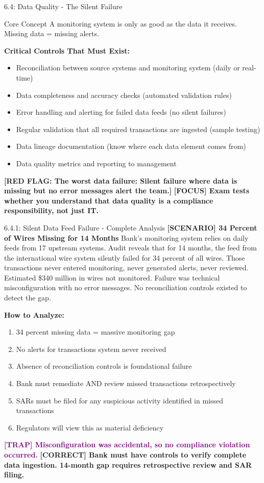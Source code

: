 \documentclass[11pt,a4paper]{beamer}
\newcommand{\examfocus}[1]{\textcolor{orange!80!black}{\textbf{[FOCUS] #1}}}
\newcommand{\trap}[1]{\textcolor{purple}{\textbf{[TRAP] #1}}}
\newcommand{\correct}[1]{\textcolor{green!50!black}{\textbf{[CORRECT] #1}}}
\newcommand{\scenario}[1]{\textcolor{blue!70!black}{\textbf{[SCENARIO] #1}}}
\newcommand{\redflag}[1]{\textcolor{red!80!black}{\textbf{[RED FLAG: #1]}}}
\begin{document}
\begin{frame}{6.4: Data Quality - The Silent Failure}
	\begin{block}{Core Concept}
		A monitoring system is only as good as the data it receives. Missing data = missing alerts.
	\end{block}
	\textbf{Critical Controls That Must Exist:}
	\begin{itemize}
		\item Reconciliation between source systems and monitoring system (daily or real-time)
		\item Data completeness and accuracy checks (automated validation rules)
		\item Error handling and alerting for failed data feeds (no silent failures)
		\item Regular validation that all required transactions are ingested (sample testing)
		\item Data lineage documentation (know where each data element comes from)
		\item Data quality metrics and reporting to management
	\end{itemize}
	\redflag{The worst data failure: Silent failure where data is missing but no error messages alert the team.}
	\examfocus{Exam tests whether you understand that data quality is a compliance responsibility, not just IT.}
\end{frame}

\begin{frame}{6.4.1: Silent Data Feed Failure - Complete Analysis}
	\scenario{34 Percent of Wires Missing for 14 Months}
	Bank's monitoring system relies on daily feeds from 17 upstream systems. Audit reveals that for 14 months, the feed from the international wire system silently failed for 34 percent of all wires. Those transactions never entered monitoring, never generated alerts, never reviewed. Estimated \$340 million in wires not monitored. Failure was technical misconfiguration with no error messages. No reconciliation controls existed to detect the gap.
	
	\vspace{0.1cm}
	\textbf{How to Analyze:}
	\begin{enumerate}
		\item 34 percent missing data = massive monitoring gap
		\item No alerts for transactions system never received
		\item Absence of reconciliation controls is foundational failure
		\item Bank must remediate AND review missed transactions retrospectively
		\item SARs must be filed for any suspicious activity identified in missed transactions
		\item Regulators will view this as material deficiency
	\end{enumerate}
	\trap{Misconfiguration was accidental, so no compliance violation occurred.}
	\correct{Bank must have controls to verify complete data ingestion. 14-month gap requires retrospective review and SAR filing.}
\end{frame}
\end{document}
